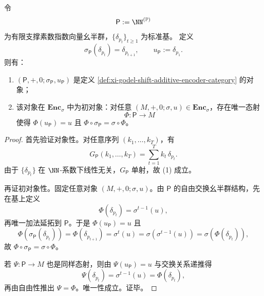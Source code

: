 \begin{theorem}\label{thm:xi-godel-prime-register-initial-object}
令
\[
\mathsf P:=\NN^{(\mathbb P)}
\]
为有限支撑素数指数向量幺半群，\(\{\delta_{p_t}\}_{t\ge 1}\) 为标准基。
定义
\[
\sigma_{\mathsf P}(\delta_{p_t})=\delta_{p_{t+1}},\qquad u_{\mathsf P}:=\delta_{p_1}.
\]
则有：
\begin{enumerate}
  \item \((\mathsf P,+,0;\sigma_{\mathsf P},u_{\mathsf P})\) 是定义 \ref{def:xi-godel-shift-additive-encoder-category} 的对象；
  \item 该对象在 \(\mathbf{Enc}_\sigma\) 中为初对象：对任意 \((M,+,0;\sigma,u)\in\mathbf{Enc}_\sigma\)，存在唯一态射
  \[
  \Phi:\mathsf P\to M
  \]
  使得 \(\Phi(u_{\mathsf P})=u\) 且 \(\Phi\circ\sigma_{\mathsf P}=\sigma\circ\Phi\)。
\end{enumerate}
\end{theorem}
\begin{proof}
首先验证对象性。对任意序列 \((k_1,\dots,k_T)\)，有
\[
G_{\mathsf P}(k_1,\dots,k_T)=\sum_{t=1}^T k_t\,\delta_{p_t}.
\]
由于 \(\{\delta_{p_t}\}\) 在 \(\NN\)-系数下线性无关，\(G_{\mathsf P}\) 单射，故 (1) 成立。

再证初对象性。固定任意对象 \((M,+,0;\sigma,u)\)。由 \(\mathsf P\) 的自由交换幺半群结构，先在基上定义
\[
\Phi(\delta_{p_t})=\sigma^{t-1}(u),
\]
再唯一加法延拓到 \(\mathsf P\)。于是 \(\Phi(u_{\mathsf P})=u\) 且
\[
\Phi(\sigma_{\mathsf P}(\delta_{p_t}))
=\Phi(\delta_{p_{t+1}})
=\sigma^t(u)
=\sigma(\sigma^{t-1}(u))
=\sigma(\Phi(\delta_{p_t})),
\]
故 \(\Phi\circ\sigma_{\mathsf P}=\sigma\circ\Phi\)。

若 \(\Psi:\mathsf P\to M\) 也是同样态射，则由 \(\Psi(u_{\mathsf P})=u\) 与交换关系递推得
\[
\Psi(\delta_{p_t})=\sigma^{t-1}(u)=\Phi(\delta_{p_t}),
\]
再由自由性推出 \(\Psi=\Phi\)。唯一性成立。证毕。
\end{proof}

